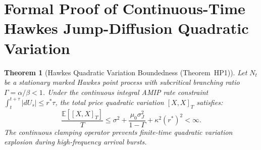 \documentclass[11pt,a4paper]{article}
\newtheorem{theorem}{Theorem}[section]
\theoremstyle{definition}\newtheorem{definition}[theorem]{Definition}
\theoremstyle{remark}\newtheorem{remark}[theorem]{Remark}
\begin{document}
\section{Formal Proof of Continuous-Time Hawkes Jump-Diffusion Quadratic Variation}
\label{sec:supp_continuous_hawkes}
\begin{theorem}[Hawkes Quadratic Variation Boundedness (Theorem~HP1)]\label{thm:supp_hp1}
Let $N_t$ be a stationary marked Hawkes point process with subcritical branching ratio $\Gamma = \alpha / \beta < 1$. Under the continuous integral AMIP rate constraint $\int_t^{t+\tau} |dU_s| \le r^* \tau$, the total price quadratic variation $[X, X]_T$ satisfies:
\begin{equation}
\frac{\mathbb{E}[[X, X]_T]}{T} \le \sigma^2 + \frac{\mu_0 \sigma_J^2}{1 - \Gamma} + \kappa^2 (r^*)^2 < \infty.
\end{equation}
The continuous clamping operator prevents finite-time quadratic variation explosion during high-frequency arrival bursts.
\end{theorem}
\end{document}
